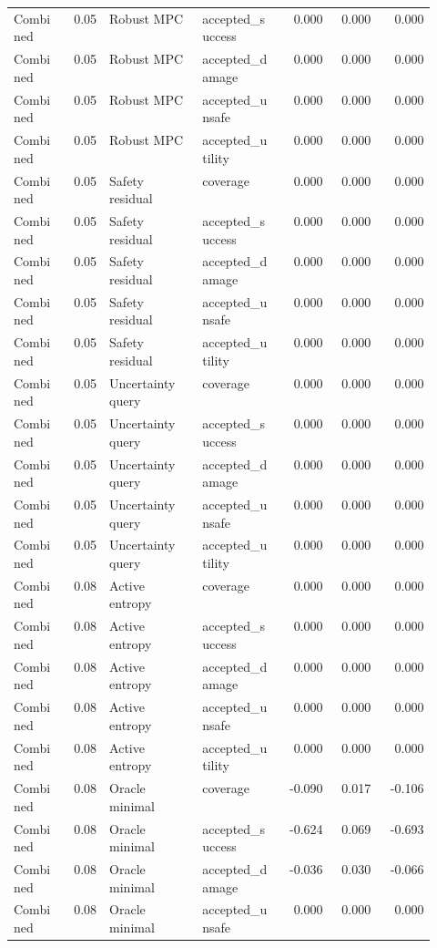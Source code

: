 \documentclass{article}
\begin{document}
\begin{center}
\begin{longtable}{p{0.13\linewidth}rp{0.22\linewidth}p{0.19\linewidth}rrr}
Combined & 0.05 & Robust MPC & accepted\_success & 0.000 & 0.000 & 0.000\\
Combined & 0.05 & Robust MPC & accepted\_damage & 0.000 & 0.000 & 0.000\\
Combined & 0.05 & Robust MPC & accepted\_unsafe & 0.000 & 0.000 & 0.000\\
Combined & 0.05 & Robust MPC & accepted\_utility & 0.000 & 0.000 & 0.000\\
Combined & 0.05 & Safety residual & coverage & 0.000 & 0.000 & 0.000\\
Combined & 0.05 & Safety residual & accepted\_success & 0.000 & 0.000 & 0.000\\
Combined & 0.05 & Safety residual & accepted\_damage & 0.000 & 0.000 & 0.000\\
Combined & 0.05 & Safety residual & accepted\_unsafe & 0.000 & 0.000 & 0.000\\
Combined & 0.05 & Safety residual & accepted\_utility & 0.000 & 0.000 & 0.000\\
Combined & 0.05 & Uncertainty query & coverage & 0.000 & 0.000 & 0.000\\
Combined & 0.05 & Uncertainty query & accepted\_success & 0.000 & 0.000 & 0.000\\
Combined & 0.05 & Uncertainty query & accepted\_damage & 0.000 & 0.000 & 0.000\\
Combined & 0.05 & Uncertainty query & accepted\_unsafe & 0.000 & 0.000 & 0.000\\
Combined & 0.05 & Uncertainty query & accepted\_utility & 0.000 & 0.000 & 0.000\\
Combined & 0.08 & Active entropy & coverage & 0.000 & 0.000 & 0.000\\
Combined & 0.08 & Active entropy & accepted\_success & 0.000 & 0.000 & 0.000\\
Combined & 0.08 & Active entropy & accepted\_damage & 0.000 & 0.000 & 0.000\\
Combined & 0.08 & Active entropy & accepted\_unsafe & 0.000 & 0.000 & 0.000\\
Combined & 0.08 & Active entropy & accepted\_utility & 0.000 & 0.000 & 0.000\\
Combined & 0.08 & Oracle minimal & coverage & -0.090 & 0.017 & -0.106\\
Combined & 0.08 & Oracle minimal & accepted\_success & -0.624 & 0.069 & -0.693\\
Combined & 0.08 & Oracle minimal & accepted\_damage & -0.036 & 0.030 & -0.066\\
Combined & 0.08 & Oracle minimal & accepted\_unsafe & 0.000 & 0.000 & 0.000\\

\end{longtable}
\end{center}
\end{document}
